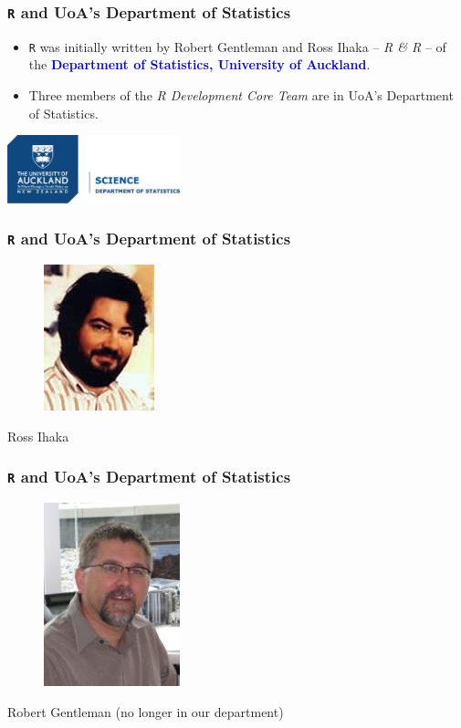 \documentclass[handout]{beamer}\usepackage[]{graphicx}\usepackage[]{color}
\begin{document}
\begin{frame}
  \frametitle{\texttt{R} and UoA's Department of Statistics}
  \begin{itemize}
  \item \texttt{R} was initially written by Robert Gentleman and Ross
    Ihaka -- \textit{R \& R} -- of the \textbf{\textcolor{blue}{Department of Statistics,
      University of Auckland}}.
  \item Three members of the \textit{R Development Core Team} are in
    UoA's Department of Statistics.
  \end{itemize}
  \centering
  \includegraphics[width=5cm]{..//..//S-DS-VC-RGB.png}
\end{frame}


\begin{frame}
  \frametitle{\texttt{R} and UoA's Department of Statistics}
  \begin{figure}[h]
    \centering
    \includegraphics[width = .3\textwidth, keepaspectratio]{ross.jpg}
  \end{figure}
   \begin{center}
     \Large Ross Ihaka
   \end{center}
\end{frame}

\begin{frame}
  \frametitle{\texttt{R} and UoA's Department of Statistics}
  \begin{figure}[h]
    \centering
    \includegraphics[width = .3\textwidth, keepaspectratio]{rob.jpg}
  \end{figure}
   \begin{center}
     \Large Robert Gentleman (no longer in our department)
   \end{center}
\end{frame}
\end{document}
